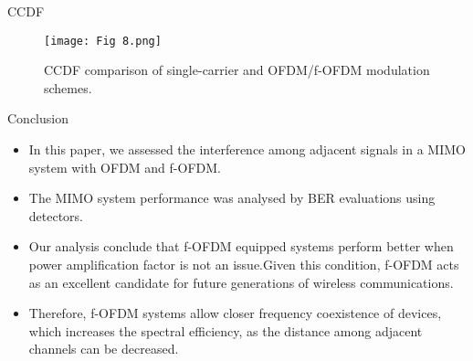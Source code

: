 \documentclass{beamer}
\begin{document}
\begin{frame}{CCDF}
    \begin{figure}
        \centering
        \texttt{[image: Fig 8.png]}
        \caption{CCDF comparison of single-carrier and OFDM/f-OFDM modulation schemes.}
          \label{fig: 8}
    \end{figure}
\end{frame}
\begin{frame}{Conclusion}
\begin{itemize}
    \item In this paper, we assessed the interference among adjacent signals in a MIMO system with OFDM and f-OFDM.
    \item The MIMO system performance was analysed by BER evaluations using detectors.
    \item Our analysis conclude that f-OFDM equipped systems perform better when power amplification factor is not an issue.Given this condition, f-OFDM acts as an excellent candidate for future generations of wireless communications.
    \item Therefore, f-OFDM systems allow closer frequency coexistence of devices, which increases the spectral efficiency, as the distance among adjacent channels can be decreased.
\end{itemize}
\end{frame}
\end{document}
